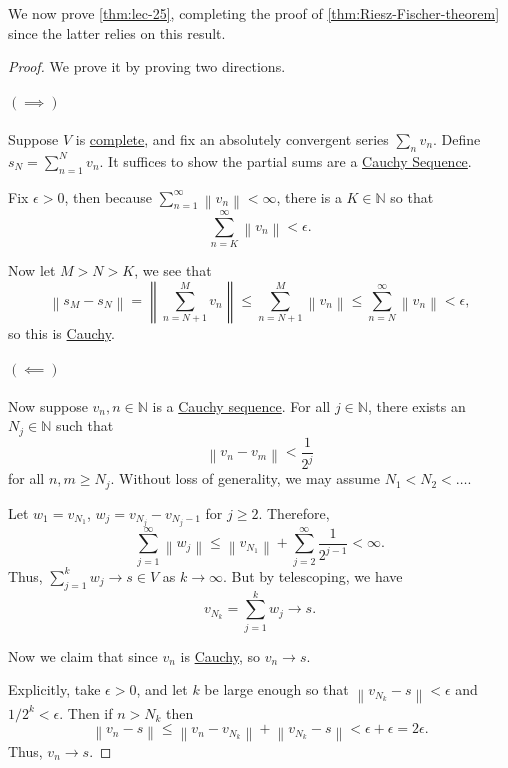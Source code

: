 We now prove \autoref{thm:lec-25}, completing the proof of \autoref{thm:Riesz-Fischer-theorem} since the latter relies on this result.

\begin{proof}\label{pf:thm:lec25}
	We prove it by proving two directions.
	\paragraph{\((\implies)\)}
	Suppose \(V\) is \hyperref[def:complete]{complete}, and fix an absolutely convergent series \(\sum_n v_n\). Define \(s_N = \sum_{n=1}^N v_n\).
	It suffices to show the partial sums are a \hyperref[def:Cauchy-sequence]{Cauchy Sequence}.

	Fix \(\epsilon > 0\), then because \(\sum_{n=1}^\infty \left\lVert v_n\right\rVert  < \infty\), there is a \(K \in \mathbb{N}\) so that
	\[
		\sum_{n=K}^\infty \left\lVert v_n\right\rVert  < \epsilon.
	\]

	Now let \(M > N > K\), we see that
	\[
		\left\lVert s_M - s_N\right\rVert = \left\lVert \sum_{n = N + 1}^M v_n\right\rVert \leq \sum_{n=N+1}^M \left\lVert v_n\right\rVert  \leq \sum_{n=N}^\infty \left\lVert v_n\right\rVert  < \epsilon,
	\]
	so this is \hyperref[def:Cauchy-sequence]{Cauchy}.

	\paragraph{\((\impliedby)\)} Now suppose \(v_n, n \in \mathbb{N}\) is a \hyperref[def:Cauchy-sequence]{Cauchy sequence}. For all \(j \in \mathbb{N}\),
	there exists an \(N_j \in \mathbb{N}\) such that
	\[
		\left\lVert v_n - v_m\right\rVert  < \frac{1}{2^j}
	\]
	for all \(n, m \geq N_j\). Without loss of generality, we may assume \(N_1 < N_2 < \ldots \).

	Let \(w_1 = v_{N_1}\), \(w_j = v_{N_j} - v_{N_j - 1}\) for \(j \geq 2\). Therefore,
	\[
		\sum_{j=1}^\infty \left\lVert w_j\right\rVert \leq \left\lVert v_{N_1}\right\rVert + \sum_{j=2}^\infty \frac{1}{2^{j-1}} < \infty.
	\]
	Thus, \(\sum_{j=1}^k w_j \to s \in V\) as \(k \to \infty\). But by telescoping, we have
	\[
		v_{N_k} = \sum_{j=1}^k w_j \to s.
	\]

	Now we claim that since \(v_n\) is \hyperref[def:Cauchy-sequence]{Cauchy}, so \(v_n \to s\).

	Explicitly, take \(\epsilon > 0\), and let \(k\) be large enough so that \(\left\lVert v_{N_k} - s\right\rVert < \epsilon\) and \(1/2^k < \epsilon\). Then if \(n > N_k\) then
	\[
		\left\lVert v_n - s\right\rVert \leq \left\lVert v_n - v_{N_k}\right\rVert + \left\lVert v_{N_k} - s\right\rVert < \epsilon + \epsilon = 2\epsilon.
	\]
	Thus, \(v_n \to s\).
\end{proof}

